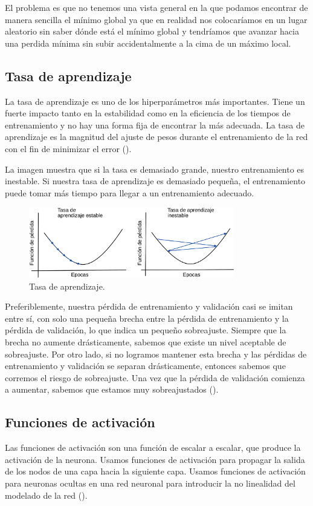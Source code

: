 El problema es que no tenemos una vista general en la que podamos encontrar de manera sencilla el mínimo global ya que en realidad nos colocaríamos en un lugar aleatorio sin saber dónde está el mínimo global y tendríamos que avanzar hacia una perdida mínima sin subir accidentalmente a la cima de un máximo local.

\subsection{Tasa de aprendizaje}

La tasa de aprendizaje es uno de los hiperparámetros más importantes. Tiene un fuerte impacto tanto en la estabilidad como en la eficiencia de los tiempos de entrenamiento y no hay una forma fija de encontrar la más adecuada. La tasa de aprendizaje es la magnitud del ajuste de pesos durante el entrenamiento de la red con el fin de minimizar el error (\cite{valenzuela2020Sistema}).

La imagen muestra que si la tasa es demasiado grande, nuestro entrenamiento es inestable. Si nuestra tasa de aprendizaje es demasiado pequeña, el entrenamiento puede tomar más tiempo para llegar a un entrenamiento adecuado.

\begin{figure}[H]
    \centering
    \includegraphics[width=0.8\textwidth]{MarcoTeorico/imgs/LearningRate.png}
    \caption{Tasa de aprendizaje.}
    \label{fig:learningRate}
\end{figure}

Preferiblemente, nuestra pérdida de entrenamiento y validación casi se imitan entre sí, con solo una pequeña brecha entre la pérdida de entrenamiento y la pérdida de validación, lo que indica un pequeño sobreajuste. Siempre que la brecha no aumente drásticamente, sabemos que existe un nivel aceptable de sobreajuste. Por otro lado, si no logramos mantener esta brecha y las pérdidas de entrenamiento y validación se separan drásticamente, entonces sabemos que corremos el riesgo de sobreajuste. Una vez que la pérdida de validación comienza a aumentar, sabemos que estamos muy sobreajustados (\cite{rosebrock2017deep}).


\subsection{Funciones de activación}

Las funciones de activación son una función de escalar a escalar, que produce la activación de la neurona. Usamos funciones de activación para propagar la salida de los nodos de una capa hacia la siguiente capa. Usamos funciones de activación para neuronas ocultas en una red neuronal para introducir la no linealidad del modelado de la red (\cite{patterson2017deep}).

